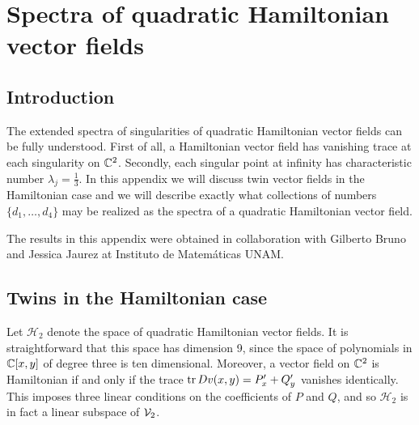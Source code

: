 \documentclass[phd,tocprelim]{cornell}
\begin{document}
\appendix
\chapter{Spectra of quadratic Hamiltonian vector fields}\label{chpt:appendix:Hamiltonian}

\section{Introduction}

The extended spectra of singularities of quadratic Hamiltonian vector fields can be fully understood. First of all, a Hamiltonian vector field has vanishing trace at each singularity on $\mathbb{C}^2$. Secondly, each singular point at infinity has characteristic number $\lambda_j=\frac{1}{3}$. In this appendix we will discuss twin vector fields in the Hamiltonian case and we will describe exactly what collections of numbers $\{d_1,\ldots,d_4\}$ may be realized as the spectra of a quadratic Hamiltonian vector field.

The results in this appendix were obtained in collaboration with Gilberto Bruno and Jessica Jaurez at Instituto de Matemáticas UNAM.




\section{Twins in the Hamiltonian case}

Let $\mathcal{H}_2$ denote the space of quadratic Hamiltonian vector fields. It is straightforward that this space has dimension 9, since the space of polynomials in $\mathbb{C}[x,y]$ of degree three is ten dimensional. Moreover, a vector field on $\mathbb{C}^2$ is Hamiltonian if and only if the trace $\operatorname{tr}{Dv(x,y)}=P'_x+Q'_y$ vanishes identically. This imposes three linear conditions on the coefficients of $P$ and $Q$, and so $\mathcal{H}_2$ is in fact a linear subspace of $\mathcal{V}_2$.

\end{document}
